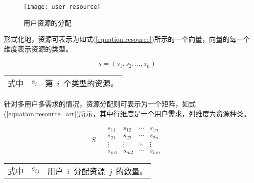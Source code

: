 \begin{figure}[htbp]
    \centering
    \texttt{[image: user\_resource]}
    \caption{用户资源的分配}\label{figure:user_resource}
    \vspace{-1em}
\end{figure}

形式化地，资源可表示为如式(\ref{equation:resource})所示的一个向量，向量的每一个维度表示资源的类型。

\begin{equation}\label{equation:resource}
s = (s_1, s_2, ..., s_n)
\end{equation}
\begin{tabularx}{\textwidth}{@{}l@{\quad}l@{\pozhehao }X@{}}
    式中
    & $s_i$ & 第~$i$~个类型的资源。
\end{tabularx}\vspace{\wordsep}

%

针对多用户多需求的情况，资源分配则可表示为一个矩阵，如式(\ref{equation:resource_arr})所示，其中行维度是一个用户需求，列维度为资源种类。

\begin{equation}\label{equation:resource_arr}
S = \begin{array}{*{20}{c}}
{{s_{11}}}&{{s_{12}}}& \cdots &{{s_{1n}}}\\
{{s_{21}}}&{{s_{22}}}& \cdots &{{s_{2n}}}\\
\vdots & \vdots & \ddots & \vdots \\
{{s_{m1}}}&{{s_{m2}}}& \cdots &{{s_{mn}}}
\end{array}
\end{equation}
\begin{tabularx}{\textwidth}{@{}l@{\quad}l@{\pozhehao }X@{}}
    式中
    & $s_{ij}$ & 用户~$i$~分配资源~$j$~的数量。
\end{tabularx}\vspace{\wordsep}

